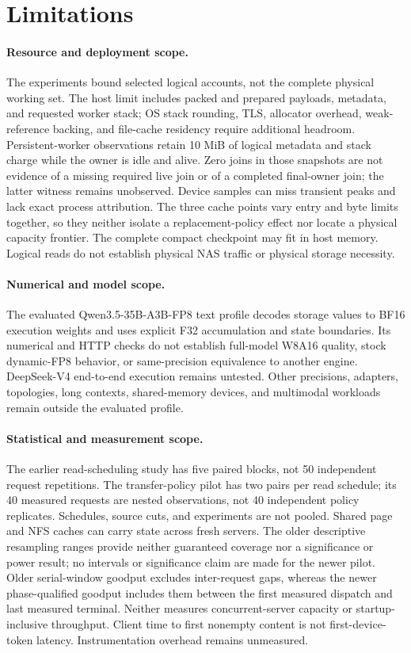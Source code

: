 \section{Limitations}
\label{sec:limitations}

\paragraph{Resource and deployment scope.}
The experiments bound selected logical accounts, not the complete physical
working set. The host limit includes packed and prepared payloads, metadata,
and requested worker stack; OS stack rounding, TLS, allocator overhead,
weak-reference backing, and file-cache residency require additional headroom.
Persistent-worker observations retain 10 MiB of logical metadata and stack
charge while the owner is idle and alive. Zero joins in those snapshots are
not evidence of a missing required live join or of a completed final-owner
join; the latter witness remains unobserved. Device samples can miss transient
peaks and lack exact process attribution. The three cache points vary entry
and byte limits together, so they neither isolate a replacement-policy effect
nor locate a physical capacity frontier. The complete compact checkpoint may
fit in host memory. Logical reads do not establish physical NAS traffic or
physical storage necessity.

\paragraph{Numerical and model scope.}
The evaluated Qwen3.5-35B-A3B-FP8 text profile decodes storage values to BF16
execution weights and uses explicit F32 accumulation and state boundaries.
Its numerical and HTTP checks do not establish full-model W8A16 quality,
stock dynamic-FP8 behavior, or same-precision equivalence to another engine.
DeepSeek-V4 end-to-end execution remains untested. Other precisions, adapters,
topologies, long contexts, shared-memory devices, and multimodal workloads
remain outside the evaluated profile.

\paragraph{Statistical and measurement scope.}
The earlier read-scheduling study has five paired blocks, not 50 independent
request repetitions. The transfer-policy pilot has two pairs per read schedule;
its 40 measured requests are nested observations, not 40 independent policy
replicates. Schedules, source cuts, and experiments are not pooled. Shared page
and NFS caches can carry state across fresh servers. The older descriptive
resampling ranges provide neither guaranteed coverage nor a significance or
power result; no intervals or significance claim are made for the newer pilot.
Older serial-window goodput excludes inter-request gaps, whereas the newer
phase-qualified goodput includes them between the first measured dispatch and
last measured terminal. Neither measures concurrent-server capacity or
startup-inclusive throughput. Client time to first nonempty content is not
first-device-token latency. Instrumentation overhead remains unmeasured.

